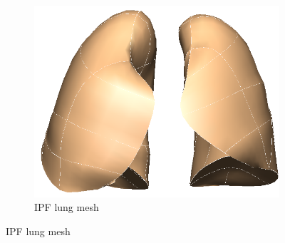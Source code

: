 \begin{figure}[htbp] 
\centering
\begin{subfigure}{.47\linewidth}%
  \includegraphics[width=\linewidth,trim={{.0\wd0} {.0\wd0} {.0\wd0} {.0\wd0}},clip]{ModelBasedAnalysis/Image/IPF405_IPFLungMesh.png}
  \caption{IPF lung mesh}
  \label{fig:LungShapePrediction-a} 
\end{subfigure}
\hspace{.4in} %

\end{figure}

